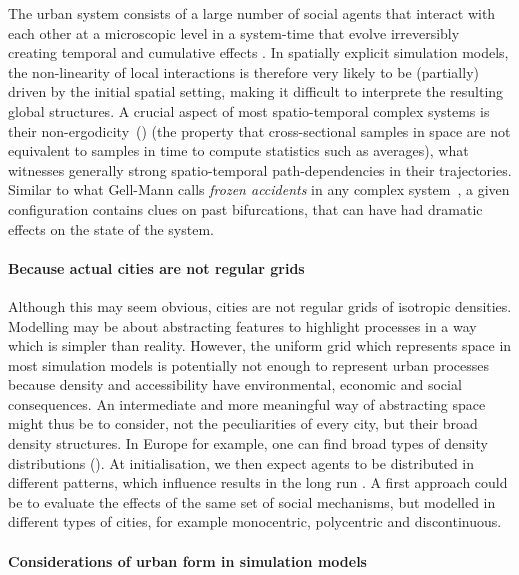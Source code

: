 \documentclass[Afour,sageh,times]{sagej}
\begin{document}
The urban system consists of a large number of social agents that interact with each other at a microscopic level in a system-time that evolve irreversibly creating temporal and cumulative effects \citep{AllenSanglier1981,Portugali2000,Wilson1981,Wilson2002,Wu2002,Batty2007,AzizAlaouiBertelle2009} . In spatially explicit simulation models, the non-linearity of local interactions is therefore very likely to be (partially) driven by the initial spatial setting, making it difficult to interprete the resulting global structures. A crucial aspect of most spatio-temporal complex systems is their non-ergodicity~(\cite{pumain2012urban}) (the property that cross-sectional samples in space are not equivalent to samples in time to compute statistics such as averages), what witnesses generally strong spatio-temporal path-dependencies in their trajectories. Similar to what Gell-Mann calls \emph{frozen accidents} in any complex system~\cite{gell1995quark}, a given configuration contains clues on past bifurcations, that can have had dramatic effects on the state of the system. 

\paragraph{Because actual cities are not regular grids}
Although this may seem obvious, cities are not regular grids of isotropic densities. Modelling may be about abstracting features to highlight processes in a way which is simpler than reality. However, the uniform grid which represents space in most simulation models is potentially not enough to represent urban processes because density and accessibility have environmental, economic and social consequences. An intermediate and more meaningful way of abstracting space might thus be to consider, not the peculiarities of every city, but their broad density structures. In Europe for example, one can find broad types of density distributions (\cite{LeNechet2015}). At initialisation, we then expect agents to be distributed in different patterns, which influence results in the long run \cite{Castellanoetal2009}. A first approach could be to evaluate the effects of the same set of social mechanisms, but modelled in different types of cities, for example monocentric, polycentric and discontinuous.

\paragraph{Considerations of urban form in simulation models}
\end{document}
